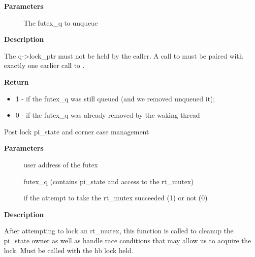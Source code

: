 \documentclass[a4paper,8pt,english]{sphinxmanual}
\begin{document}
\textbf{Parameters}
\begin{description}
\item[{}] \leavevmode
The futex\_q to unqueue

\end{description}

\textbf{Description}

The q-\textgreater{}lock\_ptr must not be held by the caller. A call to {\hyperref[kernel\string-hacking/locking:c.unqueue_me]{\emph{}}} must
be paired with exactly one earlier call to {\hyperref[kernel\string-hacking/locking:c.queue_me]{\emph{}}}.

\textbf{Return}
\begin{itemize}
\item {} 
1 - if the futex\_q was still queued (and we removed unqueued it);

\item {} 
0 - if the futex\_q was already removed by the waking thread

\end{itemize}

\begin{fulllineitems}
\label{kernel-hacking/locking:c.fixup_owner}
Post lock pi\_state and corner case management

\end{fulllineitems}


\textbf{Parameters}
\begin{description}
\item[{}] \leavevmode
user address of the futex

\item[{}] \leavevmode
futex\_q (contains pi\_state and access to the rt\_mutex)

\item[{}] \leavevmode
if the attempt to take the rt\_mutex succeeded (1) or not (0)

\end{description}

\textbf{Description}

After attempting to lock an rt\_mutex, this function is called to cleanup
the pi\_state owner as well as handle race conditions that may allow us to
acquire the lock. Must be called with the hb lock held.
\end{document}
